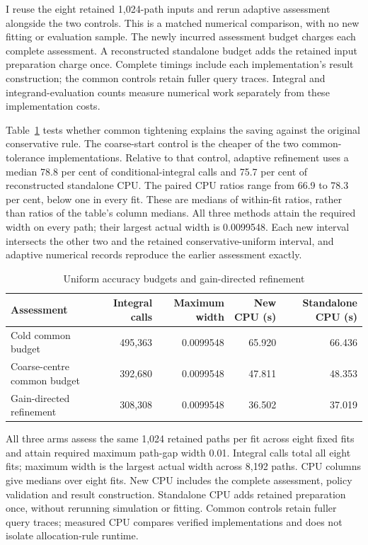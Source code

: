 \documentclass[11pt]{article}
\begin{document}
I reuse the eight retained 1,024-path inputs and rerun adaptive assessment alongside the two controls. This is a matched numerical comparison, with no new fitting or evaluation sample. The newly incurred assessment budget charges each complete assessment. A reconstructed standalone budget adds the retained input preparation charge once. Complete timings include each implementation's result construction; the common controls retain fuller query traces. Integral and integrand-evaluation counts measure numerical work separately from these implementation costs.


Table~\ref{tab:revision-uniform-allocation} tests whether common tightening explains the saving against the original conservative rule. The coarse-start control is the cheaper of the two common-tolerance implementations. Relative to that control, adaptive refinement uses a median 78.8 per cent of conditional-integral calls and 75.7 per cent of reconstructed standalone CPU. The paired CPU ratios range from 66.9 to 78.3 per cent, below one in every fit. These are medians of within-fit ratios, rather than ratios of the table's column medians. All three methods attain the required width on every path; their largest actual width is 0.0099548. Each new interval intersects the other two and the retained conservative-uniform interval, and adaptive numerical records reproduce the earlier assessment exactly.

\begingroup
\setlength{\tabcolsep}{5.5pt}
\begin{table}[!htbp]
\centering\small
\caption{Uniform accuracy budgets and gain-directed refinement}\label{tab:revision-uniform-allocation}
\begin{tabular}{@{}lrrrr@{}}
\toprule
Assessment & Integral calls & Maximum width & New CPU (s) & Standalone CPU (s) \\
\midrule
Cold common budget & 495,363 & 0.0099548 & 65.920 & 66.436 \\
Coarse-centre common budget & 392,680 & 0.0099548 & 47.811 & 48.353 \\
Gain-directed refinement & 308,308 & 0.0099548 & 36.502 & 37.019 \\
\bottomrule
\end{tabular}
\par\smallskip\begin{minipage}{\textwidth}\footnotesize All three arms assess the same 1,024 retained paths per fit across eight fixed fits and attain required maximum path-gap width 0.01. Integral calls total all eight fits; maximum width is the largest actual width across 8,192 paths. CPU columns give medians over eight fits. New CPU includes the complete assessment, policy validation and result construction. Standalone CPU adds retained preparation once, without rerunning simulation or fitting. Common controls retain fuller query traces; measured CPU compares verified implementations and does not isolate allocation-rule runtime.\end{minipage}
\end{table}
\endgroup
\end{document}
